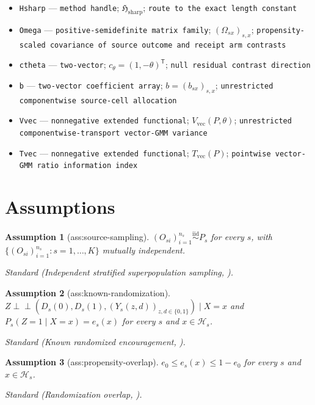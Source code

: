 \documentclass{article}
\newtheorem{assumption}{Assumption}
\begin{document}
\begin{itemize}
  \item \texttt{Hsharp} --- \texttt{method handle}; \(\mathfrak H_{\mathrm{sharp}}\); \texttt{route to the exact length constant}
  \item \texttt{Omega} --- \texttt{positive-\allowbreak{}semidefinite matrix family}; \((\Omega_{sx})_{s,x}\); \texttt{propensity-\allowbreak{}scaled covariance of source outcome and receipt arm contrasts}
  \item \texttt{ctheta} --- \texttt{two-\allowbreak{}vector}; \(c_\theta=(1,-\theta)^{\mathsf T}\); \texttt{null residual contrast direction}
  \item \texttt{b} --- \texttt{two-\allowbreak{}vector coefficient array}; \(b=(b_{sx})_{s,x}\); \texttt{unrestricted componentwise source-\allowbreak{}cell allocation}
  \item \texttt{Vvec} --- \texttt{nonnegative extended functional}; \(V_{\mathrm{vec}}(P,\theta)\); \texttt{unrestricted componentwise-\allowbreak{}transport vector-\allowbreak{}GMM variance}
  \item \texttt{Tvec} --- \texttt{nonnegative extended functional}; \(T_{\mathrm{vec}}(P)\); \texttt{pointwise vector-\allowbreak{}GMM ratio information index}
\end{itemize}

\section{Assumptions}

\begin{assumption}[ass:source-sampling]\label{ass:source-sampling}
\((O_{si})_{i=1}^{n_s}\stackrel{\mathrm{iid}}{\sim}P_s\) for every \(s\), with \(\{(O_{si})_{i=1}^{n_s}:s=1,\ldots,K\}\) mutually independent.
\par\smallskip\noindent\emph{Standard} (Independent stratified superpopulation sampling, \cite{DahabrehRobertsonPetitoHernanSteingrimsson2023}).
\end{assumption}

\begin{assumption}[ass:known-randomization]\label{ass:known-randomization}
\(Z\perp\!\!\perp(D_s(0),D_s(1),(Y_s(z,d))_{z,d\in\{0,1\}})\mid X=x\) and \(P_s(Z=1\mid X=x)=e_s(x)\) for every \(s\) and \(x\in\mathcal H_s\).
\par\smallskip\noindent\emph{Standard} (Known randomized encouragement, \cite{ImbensAngrist1994}).
\end{assumption}

\begin{assumption}[ass:propensity-overlap]\label{ass:propensity-overlap}
\(e_0\le e_s(x)\le1-e_0\) for every \(s\) and \(x\in\mathcal H_s\).
\par\smallskip\noindent\emph{Standard} (Randomization overlap, \cite{Ma2026}).
\end{assumption}
\end{document}
